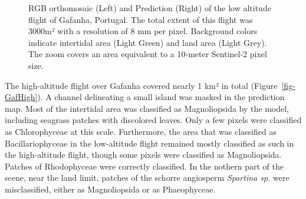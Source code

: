 \documentclass[
  number]{elsarticle}
\begin{document}
\label{cell-fig-GafLow}
\begin{figure}[H]


\caption{\label{fig-GafLow}RGB orthomosaic (Left) and Prediction (Right)
of the low altitude flight of Gafanha, Portugal. The total extent of
this flight was 3000m² with a resolution of 8 mm per pixel. Background
colors indicate intertidal area (Light Green) and land area (Light
Grey). The zoom covers an area equivalent to a 10-meter Sentinel-2 pixel
size.}

\end{figure}%

The high-altitude flight over Gafanha covered nearly 1 km² in total
(Figure~\ref{fig-GafHigh}). A channel delineating a small island was
masked in the prediction map. Most of the intertidal area was classified
as Magnoliopsida by the model, including seagrass patches with
discolored leaves. Only a few pixels were classified as Chlorophyceae at
this scale. Furthermore, the area that was classified as
Bacillariophyceae in the low-altitude flight remained mostly classified
as such in the high-altitude flight, though some pixels were classified
as Magnoliopsida. Patches of Rhodophyceae were correctly classified. In
the nothern part of the scene, near the land limit, patches of the
schorre angiosperm \emph{Spartina sp.} were misclassified, either as
Magnoliopsida or as Phaeophyceae.
\end{document}

